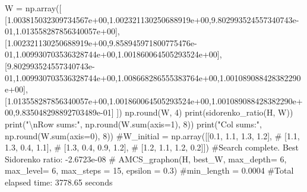 \documentclass[
  letterpaper,
  DIV=11,
  numbers=noendperiod]{scrartcl}
\newenvironment{Shaded}{\begin{snugshade}}{\end{snugshade}}
\newcommand{\BuiltInTok}[1]{\textcolor[rgb]{0.00,0.23,0.31}{#1}}
\newcommand{\CharTok}[1]{\textcolor[rgb]{0.13,0.47,0.30}{#1}}
\newcommand{\CommentTok}[1]{\textcolor[rgb]{0.37,0.37,0.37}{#1}}
\newcommand{\DecValTok}[1]{\textcolor[rgb]{0.68,0.00,0.00}{#1}}
\newcommand{\FloatTok}[1]{\textcolor[rgb]{0.68,0.00,0.00}{#1}}
\newcommand{\NormalTok}[1]{\textcolor[rgb]{0.00,0.23,0.31}{#1}}
\newcommand{\OperatorTok}[1]{\textcolor[rgb]{0.37,0.37,0.37}{#1}}
\newcommand{\StringTok}[1]{\textcolor[rgb]{0.13,0.47,0.30}{#1}}
\begin{document}
\begin{Shaded}
\begin{Highlighting}[]
\NormalTok{W }\OperatorTok{=}\NormalTok{ np.array([}
\NormalTok{  [}\FloatTok{1.003815032309734567e+00}\NormalTok{,}\FloatTok{1.002321130250688919e+00}\NormalTok{,}\FloatTok{9.802993524557340743e{-}01}\NormalTok{,}\FloatTok{1.013558287856340057e+00}\NormalTok{],}
\NormalTok{[}\FloatTok{1.002321130250688919e+00}\NormalTok{,}\FloatTok{9.858945971800775476e{-}01}\NormalTok{,}\FloatTok{1.009930703536328744e+00}\NormalTok{,}\FloatTok{1.001860064505293524e+00}\NormalTok{],}
\NormalTok{[}\FloatTok{9.802993524557340743e{-}01}\NormalTok{,}\FloatTok{1.009930703536328744e+00}\NormalTok{,}\FloatTok{1.008668286555383764e+00}\NormalTok{,}\FloatTok{1.001089088428382290e+00}\NormalTok{],}
\NormalTok{[}\FloatTok{1.013558287856340057e+00}\NormalTok{,}\FloatTok{1.001860064505293524e+00}\NormalTok{,}\FloatTok{1.001089088428382290e+00}\NormalTok{,}\FloatTok{9.835048298892703489e{-}01}\NormalTok{]}
\NormalTok{])}
\NormalTok{np.}\BuiltInTok{round}\NormalTok{(W, }\DecValTok{4}\NormalTok{)}
\BuiltInTok{print}\NormalTok{(sidorenko\_ratio(H, W))}
\BuiltInTok{print}\NormalTok{(}\StringTok{"}\CharTok{\textbackslash{}n}\StringTok{Row sums:"}\NormalTok{, np.}\BuiltInTok{round}\NormalTok{(W.}\BuiltInTok{sum}\NormalTok{(axis}\OperatorTok{=}\DecValTok{1}\NormalTok{), }\DecValTok{8}\NormalTok{))}
\BuiltInTok{print}\NormalTok{(}\StringTok{"Col sums:"}\NormalTok{, np.}\BuiltInTok{round}\NormalTok{(W.}\BuiltInTok{sum}\NormalTok{(axis}\OperatorTok{=}\DecValTok{0}\NormalTok{), }\DecValTok{8}\NormalTok{))}
\CommentTok{\#W\_initial = np.array([[0.1, 1.1, 1.3, 1.2],}
   \CommentTok{\# [1.1, 1.3, 0.4, 1.1],}
   \CommentTok{\# [1.3, 0.4, 0.9, 1.2],}
   \CommentTok{\# [1.2, 1.1, 1.2, 0.2]])}
\CommentTok{\#Search complete. Best Sidorenko ratio: {-}2.6723e{-}08}
\CommentTok{\# AMCS\_graphon(H, best\_W, max\_depth= 6, max\_level= 6, max\_steps = 15, epsilon = 0.3)}
\CommentTok{\#min\_length = 0.0004}
\CommentTok{\#Total elapsed time: 3778.65 seconds}


\end{Highlighting}
\end{Shaded}
\end{document}
